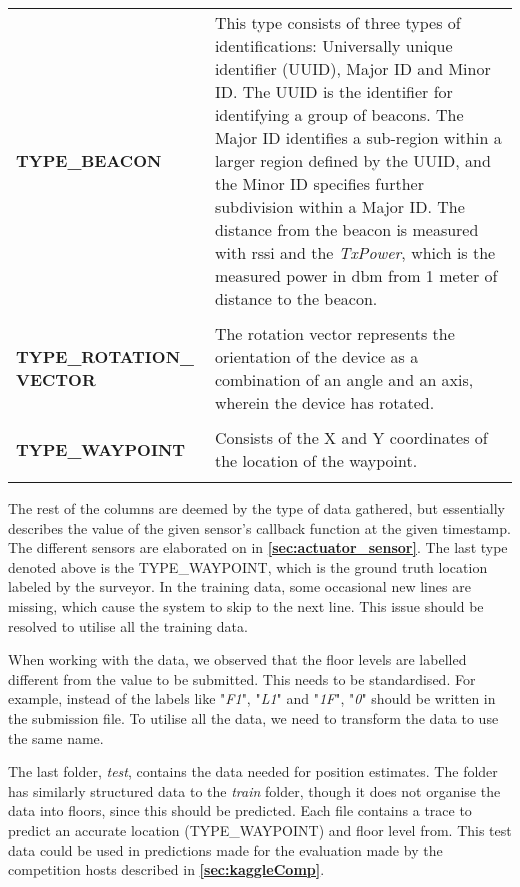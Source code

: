 \begin{longtable}{ p{}  p{}}
\textbf{TYPE\_BEACON} & This type consists of three types of identifications: Universally unique identifier (UUID), Major ID and Minor ID. The UUID is the identifier for identifying a group of beacons. The Major ID identifies a sub-region within a larger region defined by the UUID, and the Minor ID specifies further subdivision within a Major ID. The distance from the beacon is measured with \gls{rssi} and the \textit{TxPower}, which is the measured power in \gls{dbm} from 1 meter of distance to the beacon.\cite{beaconsinfo}
\\\\

\textbf{TYPE\_ROTATION\_ \newline VECTOR} & The rotation vector represents the orientation of the device as a combination of an angle and an axis, wherein the device has rotated\cite{sensorevent}.
\\\\

\textbf{TYPE\_WAYPOINT} & Consists of the X and Y coordinates of the location of the waypoint.
\\\\

\end{longtable}

The rest of the columns are deemed by the type of data gathered, but essentially describes the value of the given sensor's callback function at the given timestamp. The different sensors are elaborated on in \textbf{\autoref{sec:actuator_sensor}}. The last type denoted above is the TYPE\_WAYPOINT, which is the ground truth location labeled by the surveyor.\cite{KaggleDataGithub} In the training data, some occasional new lines are missing, which cause the system to skip to the next line. This issue should be resolved to utilise all the training data.\cite{KaggleData}

When working with the data, we observed that the floor levels are labelled different from the value to be submitted. This needs to be standardised. For example, instead of the labels like "\textit{F1}", "\textit{L1}" and "\textit{1F}", "\textit{0}" should be written in the submission file. To utilise all the data, we need to transform the data to use the same name.

The last folder, \textit{test}, contains the data needed for position estimates. The folder has similarly structured data to the \textit{train} folder, though it does not organise the data into floors, since this should be predicted. Each file contains a trace to predict an accurate location (TYPE\_WAYPOINT) and floor level from. This test data could be used in predictions made for the evaluation made by the competition hosts described in \textbf{\autoref{sec:kaggleComp}}.\cite{KaggleData}

